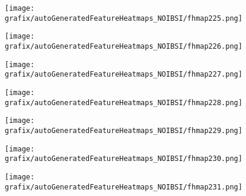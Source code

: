 \hspace{\hsp} 
\begin{subfigure}{\wid\textwidth} 
    \centering 
    \caption{\tiny \sffamily {}} 
    \vspace{\vsp} 
    \texttt{[image: grafix/autoGeneratedFeatureHeatmaps\_NOIBSI/fhmap225.png]} 
\end{subfigure} 
\hspace{\hsp} 
\begin{subfigure}{\wid\textwidth} 
    \centering 
    \caption{\tiny \sffamily {}} 
    \vspace{\vsp} 
    \texttt{[image: grafix/autoGeneratedFeatureHeatmaps\_NOIBSI/fhmap226.png]} 
\end{subfigure} 
\hspace{\hsp} 
\begin{subfigure}{\wid\textwidth} 
    \centering 
    \caption{\tiny \sffamily {}} 
    \vspace{\vsp} 
    \texttt{[image: grafix/autoGeneratedFeatureHeatmaps\_NOIBSI/fhmap227.png]} 
\end{subfigure} 
\hspace{\hsp} 
\begin{subfigure}{\wid\textwidth} 
    \centering 
    \caption{\tiny \sffamily {}} 
    \vspace{\vsp} 
    \texttt{[image: grafix/autoGeneratedFeatureHeatmaps\_NOIBSI/fhmap228.png]} 
\end{subfigure} 
\hspace{\hsp} 
\begin{subfigure}{\wid\textwidth} 
    \centering 
    \caption{\tiny \sffamily {}} 
    \vspace{\vsp} 
    \texttt{[image: grafix/autoGeneratedFeatureHeatmaps\_NOIBSI/fhmap229.png]} 
\end{subfigure} 
\hspace{\hsp} 
\begin{subfigure}{\wid\textwidth} 
    \centering 
    \caption{\tiny \sffamily {}} 
    \vspace{\vsp} 
    \texttt{[image: grafix/autoGeneratedFeatureHeatmaps\_NOIBSI/fhmap230.png]} 
\end{subfigure} 
\hspace{\hsp} 
\begin{subfigure}{\wid\textwidth} 
    \centering 
    \caption{\tiny \sffamily {}} 
    \vspace{\vsp} 
    \texttt{[image: grafix/autoGeneratedFeatureHeatmaps\_NOIBSI/fhmap231.png]} 
\end{subfigure} 
